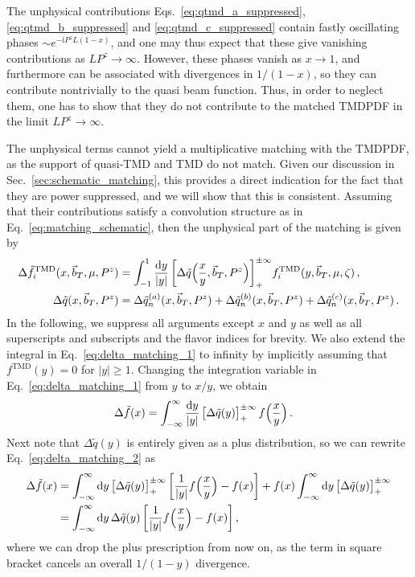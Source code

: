 \documentclass[11pt,a4paper]{article}
\DeclareRobustCommand{\eq}[1]{Eq.~\eqref{eq:#1}}
\DeclareRobustCommand{\eqss}[3]{Eqs.~\eqref{eq:#1}, \eqref{eq:#2} and \eqref{eq:#3}}
\DeclareRobustCommand{\sec}[1]{Sec.~\ref{sec:#1}}
\newcommand{\df}{\mathrm{d}}
\newcommand{\img}{\mathrm{i}}
\newcommand{\nn}{\nonumber}
\newcommand\TMD{\mathrm{TMD}}
\newcommand{\bt}{\vec b_T}
\newcommand{\plusinf}{_+^{\pm\infty}}
\begin{document}
The unphysical contributions \eqss{qtmd_a_suppressed}{qtmd_b_suppressed}{qtmd_c_suppressed} contain fastly oscillating phases $\sim e^{-\img P^z L (1-x)}$,
and one may thus expect that these give vanishing contributions as $L P^z \to \infty$.
However, these phases vanish as $x\to1$, and furthermore can be associated with divergences in $1/(1-x)$,
so they can contribute nontrivially to the quasi beam function.
Thus, in order to neglect them, one has to show that they do not contribute to the matched TMDPDF in the limit $L P^z \to \infty$.

The unphysical terms cannot yield a multiplicative matching with the TMDPDF, as the support of quasi-TMD and TMD do not match. Given our discussion in \sec{schematic_matching}, this provides a direct indication for the fact that they are power suppressed, and we will show that this is consistent. Assuming that their contributions satisfy a convolution structure as in \eq{matching_schematic}, then the unphysical part of the matching is given by
\begin{align} \label{eq:delta_matching_1}
 \Delta \tilde f_i^\TMD(x, \bt, \mu, P^z) &
 =  \int_{-1}^1 \frac{\df y}{|y|} \, \biggl[\Delta \tilde q\Bigl(\frac{x}{y}, \bt, P^z\Bigr)\biggr]\plusinf f_i^\TMD(y, \bt, \mu, \zeta)
\,,\nn\\
 \Delta \tilde q(x, \bt, P^z) &= \Delta\tilde q_n^{(a)}(x, \bt, P^z) + \Delta\tilde q_n^{(b)}(x, \bt, P^z) + \Delta\tilde q_n^{(c)}(x, \bt, P^z)
\,.\end{align}
In the following, we suppress all arguments except $x$ and $y$ as well as all superscripts and subscripts and the flavor indices for brevity.
We also extend the integral in \eq{delta_matching_1} to infinity by implicitly assuming that $f^\TMD(y) = 0$ for $|y|\ge1$.
Changing the integration variable in \eq{delta_matching_1} from $y$ to $x/y$, we obtain
\begin{align} \label{eq:delta_matching_2}
 \Delta \tilde f(x) &
 = \int_{-\infty}^\infty \frac{\df y}{|y|} \, \bigl[\Delta \tilde q(y)\bigr]\plusinf  \, f\Bigl(\frac{x}{y}\Bigr)
\,.\end{align}
Next note that $\Delta\tilde q(y)$ is entirely given as a plus distribution, so we can rewrite \eq{delta_matching_2} as
\begin{align} \label{eq:delta_matching_3}
 \Delta \tilde f(x) &
 = \int_{-\infty}^\infty \df y \, \bigl[\Delta \tilde q(y)\bigr]\plusinf  \, \biggl[ \frac{1}{|y|} f\Bigl(\frac{x}{y}\Bigr) - f(x) \biggr]
   + f(x) \int_{-\infty}^\infty \df y \, \bigl[\Delta \tilde q(y)\bigr]\plusinf
\nn\\&
 = \int_{-\infty}^\infty \df y \, \Delta \tilde q(y) \, \biggl[ \frac{1}{|y|} f\Bigl(\frac{x}{y}\Bigr) - f(x) \biggr]
\,,\end{align}
where we can drop the plus prescription from now on, as the term in square bracket cancels an overall $1/(1-y)$ divergence.
\end{document}
